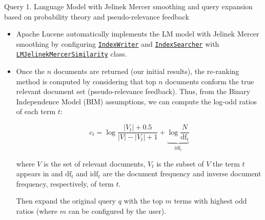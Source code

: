 \documentclass[10pt]{beamer}
\begin{document}
{
\begin{frame}{Query 1. Language Model with Jelinek Mercer smoothing and query expansion based on probability theory and pseudo-relevance feedback}
    \begin{itemize}
        \item Apache Lucene automatically implements the LM model with Jelinek Mercer smoothing by configuring \href{https://lucene.apache.org/core/7_4_0/core/org/apache/lucene/index/IndexWriter.html}{\texttt{IndexWriter}} and \href{https://lucene.apache.org/core/8_0_0/core/org/apache/lucene/search/IndexSearcher.html}{\texttt{IndexSearcher}} with  \href{https://lucene.apache.org/core/8_6_2/core/org/apache/lucene/search/similarities/LMJelinekMercerSimilarity.html}{\texttt{LMJelinekMercerSimilarity}} class.
        \item Once the $n$ documents are returned (our initial results), the re-ranking method is computed by considering that top $n$ documents conform the true relevant document set (pseudo-relevance feedback). Thus, from the Binary Independence Model (BIM) assumptions, we can compute the log-odd ratios of each term $t$:
        
        \[ c_t = \log \frac{|V_t| + 0.5}{|V| - |V_t| +1 } + \underbrace{\log \frac{N}{\text{df}_t}}_{\text{idf}_t} \] 

        where $V$ is the set of relevant documents, $V_t$ is the subset of $V$ the term $t$ appears in and  $\text{df}_t$ and $\text{idf}_t$ are the document frequency and inverse document frequency, respectively, of term $t$.
        
        Then expand the original query $q$ with the top $m$ terms with highest odd ratios (where $m$ can be configured by the user).
    \end{itemize}
\end{frame}

}
\end{document}
